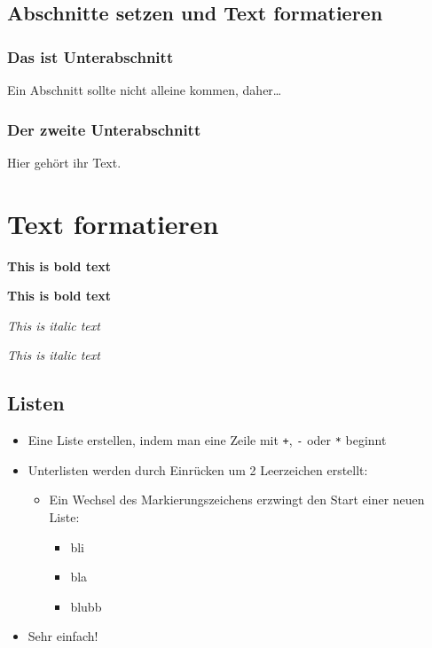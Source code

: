 \documentclass[
  stu,
  floatsintext,
  longtable,
  a4paper,
  nolmodern,
  notxfonts,
  notimes,
  donotrepeattitle,
  colorlinks=true,linkcolor=blue,citecolor=blue,urlcolor=blue]{apa7}
\providecommand{\tightlist}{%
  \setlength{\itemsep}{0pt}\setlength{\parskip}{0pt}}
\begin{document}
\subsection{Abschnitte setzen und Text
formatieren}\label{abschnitte-setzen-und-text-formatieren}

\subsubsection{Das ist Unterabschnitt}\label{das-ist-unterabschnitt}

Ein Abschnitt sollte nicht alleine kommen, daher\ldots{}

\subsubsection{Der zweite
Unterabschnitt}\label{der-zweite-unterabschnitt}

Hier gehört ihr Text.

\section{Text formatieren}\label{text-formatieren}

\textbf{This is bold text}

\textbf{This is bold text}

\emph{This is italic text}

\emph{This is italic text}

\subsection{Listen}\label{listen}

\begin{itemize}
\tightlist
\item
  Eine Liste erstellen, indem man eine Zeile mit \texttt{+}, \texttt{-}
  oder \texttt{*} beginnt
\item
  Unterlisten werden durch Einrücken um 2 Leerzeichen erstellt:

  \begin{itemize}
  \tightlist
  \item
    Ein Wechsel des Markierungszeichens erzwingt den Start einer neuen
    Liste:

    \begin{itemize}
    \tightlist
    \item
      bli
    \item
      bla
    \item
      blubb
    \end{itemize}
  \end{itemize}
\item
  Sehr einfach!
\end{itemize}
\end{document}
